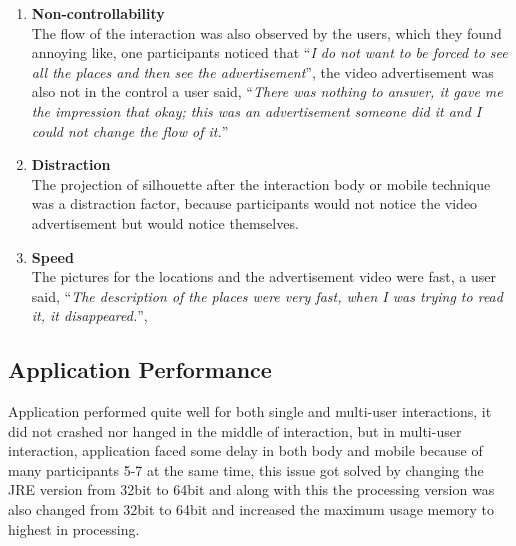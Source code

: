 \begin{itemize}
\begin{enumerate}
\item	\textbf{Non-controllability}\\
The flow of the interaction was also observed by the users, which they found annoying like, one participants noticed that ``\emph{I do not want to be forced to see all the places and then see the advertisement}'', the video advertisement was also not in the control a user said, ``\emph{There was nothing to answer, it gave me the impression that okay; this was an advertisement someone did it and I could not change the flow of it.}'' 

\item	\textbf{Distraction}\\
The projection of silhouette after the interaction body or mobile technique was a distraction factor, because participants would not notice the video advertisement but would notice themselves. 

\item	\textbf{Speed}\\
The pictures for the locations and the advertisement video were fast, a user said, ``\emph{The description of the places were very fast, when I was trying to read it, it disappeared.}'', 
\end{enumerate}

\end{itemize}


\subsection{Application Performance}
Application performed quite well for both single and multi-user interactions, it did not crashed nor hanged in the middle of interaction, but in multi-user interaction, application faced some delay in both body and mobile because of many participants 5-7 at the same time, this issue got solved by changing the JRE version from 32bit to 64bit and along with this the processing version was also changed from 32bit to 64bit and increased the maximum usage memory to highest in processing.


